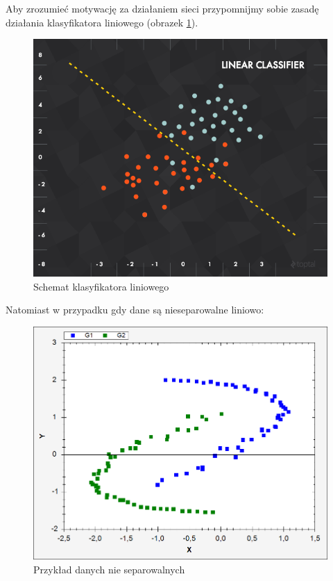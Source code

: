 \documentclass[10pt,a4paper]{book}
\begin{document}
Aby zrozumieć motywację za działaniem sieci przypomnijmy sobie zasadę działania klasyfikatora liniowego (obrazek \ref{fig.chapter.predictions.linear.ann}).
\begin{figure}
\centering
\includegraphics[scale=0.3]{images/klasyfikator_liniowy.png}
\caption{Schemat klasyfikatora liniowego}
\label{fig.chapter.predictions.linear.ann}
\end{figure}

Natomiast w przypadku gdy dane są nieseparowalne liniowo:
\begin{figure}
\centering
\includegraphics[scale=0.3]{images/nieseparowalne_dane.png}
\caption{Przykład danych nie separowalnych}
\label{fig.chapter.predictions.linear.ann.not.separable}
\end{figure}
\end{document}
